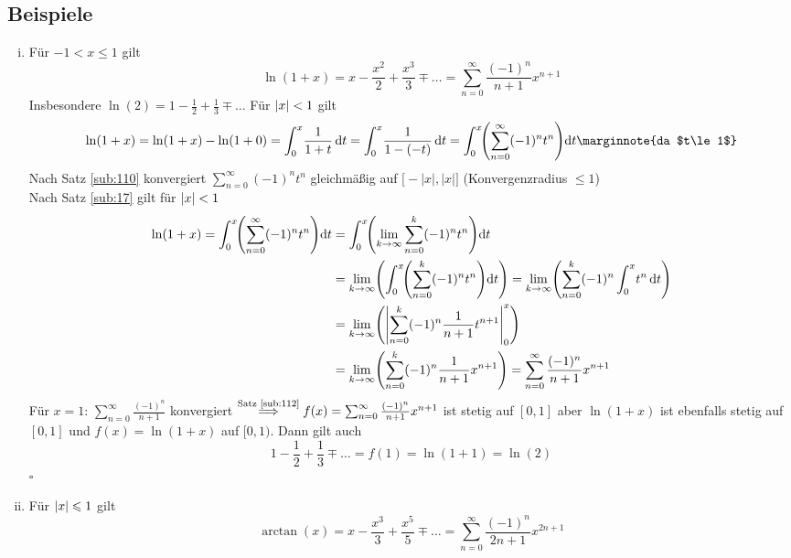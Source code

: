 \subsection[Beispiele für die Anwendung des Abelschen Grenzwertsatzes]{Beispiele} %
\label{sub:113}
\begin{enumerate}[(i)]
	\item Für $-1 < x \le 1$ gilt 
	\[
		\ln (1+x) = x - \frac{x^2}{2} + \frac{x^3}{3} \mp \ldots  = \sum_{n=0}^{\infty} \frac{(-1)^n}{n+1} x^{n+1}   
	\]
	Insbesondere $\ln (2) = 1- \frac{1}{2} + \frac{1}{3} \mp \ldots   $
	Für $\abs*{x}<1 $ gilt 
	\begin{align*}
		\ln (1+x) = \ln (1+x) - \ln(1+0) = \int_{0} ^{x} \! \frac{1}{1+t}  \, \mathrm{d}t = \int_{0} ^{x} \! \frac{1}{1-(-t)}  \, \mathrm{d}t  = \int_{0} ^{x} \! 
		\enbrace*{\sum_{n=0}^{\infty} (-1)^n t^n} \mathrm{d}t \marginnote{da $t\le 1$}
	\end{align*}
	Nach Satz \ref{sub:110} konvergiert $\sum_{n=0}^{\infty} (-1)^n t^n$ gleichmäßig auf $\big[-|x| , |x|\big]$ { \footnotesize (Konvergenzradius $\le 1$)} \\
	Nach Satz \ref{sub:17} gilt für $\abs*{x} <1 $
	\begin{align*}
		\ln(1+x) = \int_{0} ^{x} \! \enbrace*{\sum_{n=0}^{\infty} (-1)^n t^n}  \mathrm{d}t  &= \int_{0} ^{x} \! \enbrace*{\lim\limits_{ k \to \infty} \sum_{n=0}^{k}
		(-1)^n t^n } \mathrm{d}t  \\
		&= \lim\limits_{ k \to \infty} \enbrace*{\int_{0} ^{x} \!  \enbrace*{\sum_{n=0}^{k} (-1)^n t^n}  \mathrm{d}t }  = \lim\limits_{ k \to \infty} 
		\enbrace*{\sum_{n=0}^{k} (-1)^n \int_{0} ^{x} \! t^n  \, \mathrm{d}t} \\
		&= \lim\limits_{ k \to \infty} \enbrace*{\left| \sum_{n=0}^{k} (-1)^n \frac{1}{n+1} t^{n+1} \right|_0^x }  \\
		&= \lim\limits_{ k \to \infty} \enbrace*{\sum_{n=0}^{k} (-1)^n \frac{1}{n+1} x^{n+1} } = \sum_{n=0}^{\infty} \frac{(-1)^n}{n+1} x^{n+1}  
	\end{align*}
	Für $x=1$: $\sum_{n=0}^{\infty} \frac{(-1)^n}{n+1} $ konvergiert $\overset{\text{Satz \ref{sub:112}}}{\Longrightarrow} 
	f(x) = \sum_{n=0}^{\infty} \frac{(-1)^n}{n+1} x^{n+1}$ ist stetig auf $[0,1]$ aber $\ln(1+x)$ ist ebenfalls stetig auf $[0,1]$ und $f(x)= \ln(1+x)$ auf $[0,1)$.
	Dann gilt auch 
	\[
		1- \frac{1}{2}  + \frac{1}{3} \mp \ldots =f(1)= \ln (1+1) = \ln (2)
	\]
	\hfill \( \square \)
	\item Für $\abs*{x} \le 1 $ gilt 
	\[
		\arctan (x) = x - \frac{x^3}{3} + \frac{x^5}{5} \mp \ldots = \sum_{n=0}^{\infty} \frac{(-1)^n}{2n+1} x^{2n+1}   
\]
\end{enumerate}
